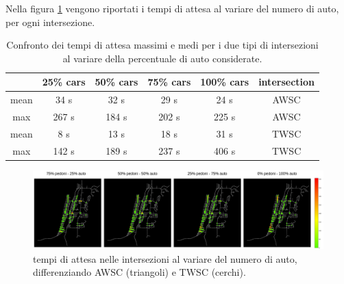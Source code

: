 Nella figura \ref{fig:analisi-comparison-car-delay} vengono riportati i tempi di attesa al variare del numero di auto,
per ogni intersezione.



\begin{table}[ht]
    \centering
    \begin{tabular}{|c|c|c|c|c|c|}
    \hline
         & 25\% cars & 50\% cars & 75\% cars & 100\% cars & intersection \\ \hline
    mean & 34 s  & 32 s  & 29 s  & 24 s  & AWSC         \\ \hline
    max  & 267 s & 184 s & 202 s & 225 s & AWSC         \\ \hline
    mean & 8 s   & 13 s  & 18 s  & 31 s  & TWSC         \\ \hline
    max  & 142 s & 189 s & 237 s & 406 s & TWSC         \\ \hline
    \end{tabular}
    \caption{Confronto dei tempi di attesa massimi e medi per i due tipi di intersezioni al variare della percentuale di auto considerate.}
    \label{tab:analisi-car-delay}
\end{table}



\begin{figure}[ht]
    \includegraphics[width=1\textwidth]{images/analisi/comparison-car-delay.png}   
    \caption{tempi di attesa nelle intersezioni al variare del numero di auto, differenziando AWSC (triangoli) e TWSC (cerchi).}
    \label{fig:analisi-comparison-car-delay}
\end{figure}


